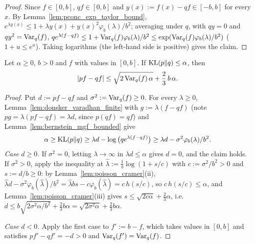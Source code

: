 \begin{proof}
\leanok
Since $f \in [0, b]$, $qf \in [0, b]$ and $y(x) := f(x) - qf \in [-b, b]$ for every $x$. By
Lemma~\ref{lem:pconc_exp_taylor_bound}, $e^{\lambda y(x)} \le 1 + \lambda y(x) + y(x)^2 \varphi_b(\lambda)/b^2$;
averaging under $q$, with $q y = 0$ and $q y^2 = \operatorname{Var}_q(f)$,
$q e^{\lambda(f - qf)} \le 1 + \operatorname{Var}_q(f)\varphi_b(\lambda)/b^2 \le \exp(\operatorname{Var}_q(f)\varphi_b(\lambda)/b^2)$
($1 + u \le e^u$). Taking logarithms (the left-hand side is positive) gives the claim.
\end{proof}

\begin{lemma}\label{lem:kl_bernstein}
\leanok
Let $\alpha \ge 0$, $b > 0$ and $f$ with values in $[0, b]$. If $\mathrm{KL}(p \| q) \le \alpha$, then
\[
  \lvert pf - qf \rvert \le \sqrt{2 \operatorname{Var}_q(f)\, \alpha} + \frac23\, b\, \alpha .
\]
\end{lemma}

\begin{proof}
\leanok
Put $d := pf - qf$ and $\sigma^2 := \operatorname{Var}_q(f) \ge 0$. For every $\lambda \ge 0$,
Lemma~\ref{lem:donsker_varadhan_finite} with $g := \lambda(f - qf)$ (note
$pg = \lambda(pf - qf) = \lambda d$, since $p(qf) = qf$) and Lemma~\ref{lem:bernstein_mgf_bounded} give
\[
  \alpha \ge \mathrm{KL}(p \| q) \ge \lambda d - \log\big(q e^{\lambda(f - qf)}\big) \ge \lambda d - \sigma^2 \varphi_b(\lambda)/b^2 .
\]
\emph{Case $d \ge 0$.} If $\sigma^2 = 0$, letting $\lambda \to \infty$ in $\lambda d \le \alpha$ gives
$d = 0$, and the claim holds. If $\sigma^2 > 0$, apply the inequality at
$\hat\lambda := \frac1b \log(1 + s/c)$ with $c := \sigma^2/b^2 > 0$ and $s := d/b \ge 0$:
by Lemma~\ref{lem:poisson_cramer}(ii), $\hat\lambda d - \sigma^2\varphi_b(\hat\lambda)/b^2 = \hat\lambda b s - c\varphi_b(\hat\lambda) = c\, h(s/c)$,
so $c\, h(s/c) \le \alpha$, and Lemma~\ref{lem:poisson_cramer}(iii) gives
$s \le \sqrt{2c\alpha} + \frac23\alpha$, i.e.\ $d \le b\sqrt{2\sigma^2\alpha/b^2} + \frac23 b\alpha = \sqrt{2\sigma^2\alpha} + \frac23 b\alpha$.

\emph{Case $d < 0$.} Apply the first case to $f' := b - f$, which takes values in $[0, b]$ and
satisfies $pf' - qf' = -d > 0$ and $\operatorname{Var}_q(f') = \operatorname{Var}_q(f)$.
\end{proof}

